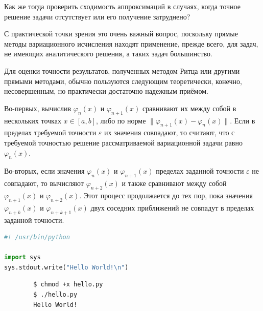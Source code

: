 \documentclass{article}
\begin{document}
\newpage
\begin{question}
	Как же тогда проверить сходимость аппроксимаций в случаях, когда точное решение задачи отсутствует или его получение затруднено?
\end{question}

С практической точки зрения это очень важный вопрос, поскольку прямые методы вариационного исчисления находят применение, прежде всего, для задач, не имеющих аналитического решения, а таких задач большинство.

Для оценки точности результатов, полученных методом Ритца или другими прямыми методами, обычно пользуются следующим теоретически, конечно, несовершенным, но практически достаточно надежным приёмом.

Во-первых, вычислив $\varphi_{n}(x)$ и $\varphi_{n+1}(x)$ сравнивают их между собой в нескольких точках $ x \in \left[a, b\right] $, либо по норме $ \parallel\varphi_{n+1}(x) - \varphi_{n}(x)\parallel$. Если в пределах требуемой точности $ \varepsilon $ их значения совпадают, то считают, что с требуемой точностью решение рассматриваемой вариационной задачи равно $ \varphi_{n}(x) $.

Во-вторых, если значения $\varphi_{n}(x)$ и $\varphi_{n+1}(x)$ пределах заданной точности $\varepsilon$ не совпадают, то вычисляют $\varphi_{n+2}(x)$ и также сравнивают между собой $\varphi_{n+1}(x)$ и $\varphi_{n+2}(x)$. Этот процесс продолжается до тех пор, пока значения $\varphi_{n+k}(x)$ и $\varphi_{n+k+1}(x)$ двух соседних приближений не совпадут в пределах заданной точности.



\newpage

\begin{file}[hello.py]
\begin{lstlisting}[language=Python]
#! /usr/bin/python

import sys
sys.stdout.write("Hello World!\n")
\end{lstlisting}
\end{file}

\begin{commandline}
	\begin{verbatim}
		$ chmod +x hello.py
		$ ./hello.py
		Hello World!
	\end{verbatim}
\end{commandline}
\end{document}
